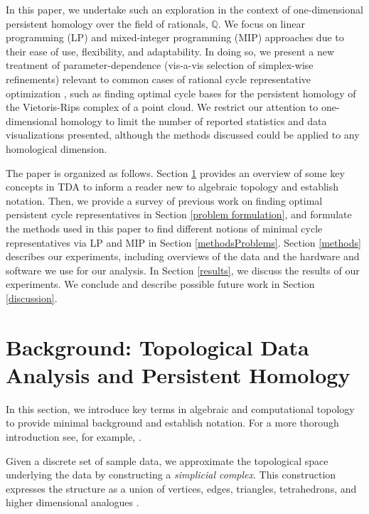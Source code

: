 \documentclass[11pt,onecolumn]{article}
\newcommand{\Q}{\mathbb{Q}}
\newcommand{\se}{Section }
\theoremstyle{plain}
\theoremstyle{definition}
\begin{document}
In this paper, we undertake such an exploration in the context of one-dimensional persistent homology over the field of rationals, $\Q$. We focus on linear programming (LP) and mixed-integer programming (MIP) approaches due to their ease of use, flexibility, and adaptability. In doing so, we present a new treatment of parameter-dependence (vis-a-vis selection of simplex-wise refinements) relevant to common cases of rational cycle representative optimization \cite{Obayashi2018, Escolar2016}, such as finding optimal cycle bases for the persistent homology of the Vietoris-Rips complex of a point cloud. We restrict our attention to one-dimensional homology to limit the number of reported statistics and data visualizations presented, although the methods discussed could be applied to any homological dimension. 

The paper is organized as follows. \se \ref{sec:background} provides an overview of some key concepts in TDA to inform a reader new to algebraic topology and establish notation. Then, we provide a survey of previous work on finding optimal persistent cycle representatives in \se \ref{problem formulation}, and formulate the methods used in this paper to find different notions of minimal cycle representatives via LP and MIP in 
\se \ref{methodsProblems}. \se \ref{methods} describes our experiments, including overviews of the data and the hardware and software we use for our analysis. In \se \ref{results},  we discuss the results of our experiments. We conclude and describe possible future work in \se \ref{discussion}.
    
 \section{Background: Topological Data Analysis and Persistent Homology} 
\label{sec:background}


In this section, we introduce key terms in algebraic and computational topology to provide minimal background and establish notation. For a more thorough introduction see, for example, \cite{Carlsson2009TopologyAD, hatcher2002algebraic, edelsbrunner2010computational, barcodeGhrist, persistenthomologyasurvey,TZH15}. 
 
 
Given a discrete set of sample data, we approximate the topological space underlying the data by constructing a \textit{simplicial complex}. This construction expresses the structure as a union of vertices, edges, triangles, tetrahedrons, and higher dimensional analogues  \cite{Carlsson2009TopologyAD}.  
\end{document}
